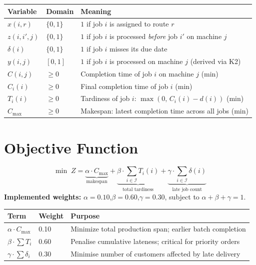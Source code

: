 \documentclass[11pt,a4paper]{article}
\begin{document}
\begin{tabularx}{\linewidth}{>{\bfseries}l l X}
  \toprule
  \rowcolor{lightblue}
  Variable & Domain & Meaning \\
  \midrule
  $x(i,r)$   & $\{0,1\}$ & $1$ if job $i$ is assigned to route $r$ \\
  \rowcolor{rowgray}
  $z(i,i',j)$ & $\{0,1\}$ & $1$ if job $i$ is processed \emph{before} job $i'$ on machine $j$ \\
  $\delta(i)$ & $\{0,1\}$ & $1$ if job $i$ misses its due date \\
  \rowcolor{rowgray}
  $y(i,j)$   & $[0,1]$   & $1$ if job $i$ is processed on machine $j$ (derived via K2) \\
  $C(i,j)$   & $\geq 0$  & Completion time of job $i$ on machine $j$ (min) \\
  \rowcolor{rowgray}
  $C_i(i)$   & $\geq 0$  & Final completion time of job $i$ (min) \\
  $T_i(i)$   & $\geq 0$  & Tardiness of job $i$: $\max(0,\, C_i(i) - d(i))$ (min) \\
  \rowcolor{rowgray}
  $C_{\max}$ & $\geq 0$  & Makespan: latest completion time across all jobs (min) \\
  \bottomrule
\end{tabularx}

\section{Objective Function}

\begin{mdframed}[backgroundcolor=lightblue, linecolor=headerblue, linewidth=1.5pt,
                  innertopmargin=8pt, innerbottommargin=8pt]
\begin{equation}
  \min\; Z = \underbrace{\alpha \cdot C_{\max}}_{\text{makespan}}
            + \underbrace{\beta \cdot \sum_{i \in \mathcal{I}} T_i(i)}_{\text{total tardiness}}
            + \underbrace{\gamma \cdot \sum_{i \in \mathcal{I}} \delta(i)}_{\text{late job count}}
\end{equation}
\textbf{Implemented weights:}\quad
$\alpha = 0.10$,\quad $\beta = 0.60$,\quad $\gamma = 0.30$,\quad
subject to $\alpha + \beta + \gamma = 1$.
\end{mdframed}

\vspace{4pt}
\begin{tabularx}{\linewidth}{>{\bfseries}l l X}
  \toprule
  \rowcolor{lightblue}
  Term & Weight & Purpose \\
  \midrule
  $\alpha \cdot C_{\max}$ & 0.10 & Minimize total production span; earlier batch completion \\
  \rowcolor{rowgray}
  $\beta \cdot \sum T_i$  & 0.60 & Penalise cumulative lateness; critical for priority orders \\
  $\gamma \cdot \sum \delta_i$ & 0.30 & Minimise number of customers affected by late delivery \\
  \bottomrule
\end{tabularx}
\end{document}
